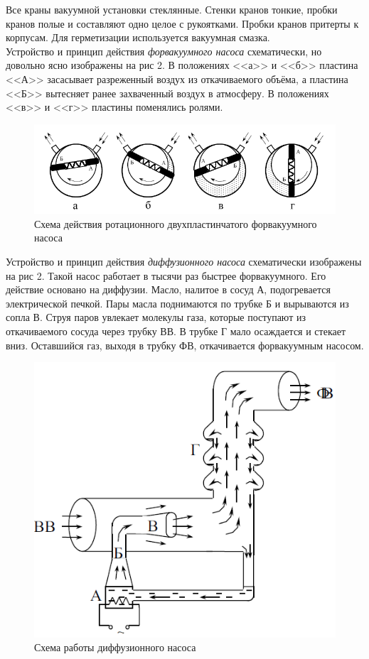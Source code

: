 \documentclass[a4paper, 12pt]{article}
\begin{document}
 Все краны вакуумной установки стеклянные. Стенки кранов тонкие, пробки кранов полые и составляют одно целое с рукоятками. Пробки кранов притерты к корпусам. Для герметизации используется вакуумная смазка. \\
 
 Устройство и принцип действия \textit{форвакуумного насоса} схематически, но довольно ясно изображены на рис 2. В положениях <<а>> и <<б>> пластина <<А>> засасывает разреженный воздух из откачиваемого объёма, а пластина <<Б>> вытесняет ранее захваченный воздух в атмосферу. В положениях <<в>> и <<г>> пластины поменялись ролями.
 
\begin{figure}[!h]
	\centering
	\includegraphics[width=0.9\linewidth]{4.png}
	\caption[]{Схема действия ротационного двухпластинчатого форвакуумного насоса}
	\label{fig:Схема ФВ насоса}
\end{figure}

Устройство и принцип действия \textit{диффузионного насоса} схематически изображены на рис 2. Такой насос работает в тысячи раз быстрее форвакуумного. Его действие основано на диффузии. Масло, налитое в сосуд А, подогревается электрической печкой. Пары масла поднимаются по трубке Б и вырываются из сопла В. Струя паров увлекает молекулы газа, которые поступают из откачиваемого сосуда через трубку ВВ. В трубке Г мало осаждается и стекает вниз. Оставшийся газ, выходя в трубку ФВ, откачивается форвакуумным насосом. \\

\begin{figure}[!h]
	\centering
	\includegraphics[width=0.4\linewidth]{5.png}
	\caption[]{Схема работы диффузионного насоса}
	\label{fig:Схема ВВ насоса}
\end{figure}
\end{document}
